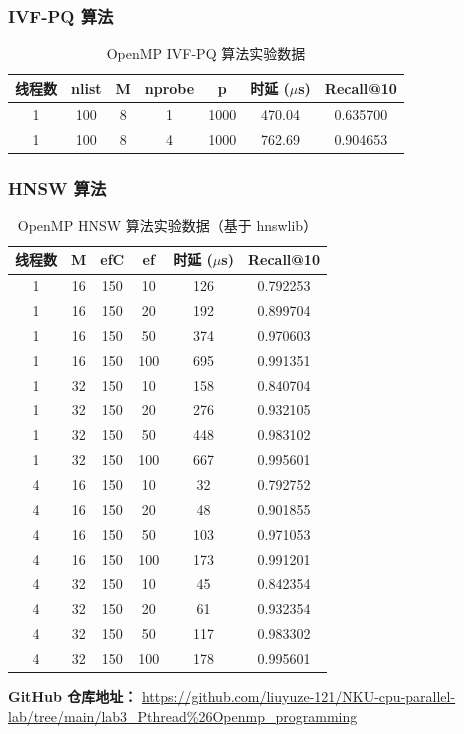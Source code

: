 \documentclass[a4paper]{article}
\begin{document}
\subsubsection{IVF-PQ 算法}

\begin{table}[H]
\centering
\caption{OpenMP IVF-PQ 算法实验数据}
\begin{tabular}{ccccccc}
\toprule
线程数 & nlist & M & nprobe & p & 时延 ($\mu$s) & Recall@10 \\
\midrule
1 & 100 & 8 & 1 & 1000 & 470.04 & 0.635700 \\
1 & 100 & 8 & 4 & 1000 & 762.69 & 0.904653 \\
\bottomrule
\end{tabular}
\end{table}

\subsubsection{HNSW 算法}

\begin{table}[H]
\centering
\caption{OpenMP HNSW 算法实验数据（基于 hnswlib）}
\begin{tabular}{cccccc}
\toprule
线程数 & M & efC & ef & 时延 ($\mu$s) & Recall@10 \\
\midrule
1 & 16 & 150 & 10 & 126 & 0.792253 \\
1 & 16 & 150 & 20 & 192 & 0.899704 \\
1 & 16 & 150 & 50 & 374 & 0.970603 \\
1 & 16 & 150 & 100 & 695 & 0.991351 \\
1 & 32 & 150 & 10 & 158 & 0.840704 \\
1 & 32 & 150 & 20 & 276 & 0.932105 \\
1 & 32 & 150 & 50 & 448 & 0.983102 \\
1 & 32 & 150 & 100 & 667 & 0.995601 \\
4 & 16 & 150 & 10 & 32 & 0.792752 \\
4 & 16 & 150 & 20 & 48 & 0.901855 \\
4 & 16 & 150 & 50 & 103 & 0.971053 \\
4 & 16 & 150 & 100 & 173 & 0.991201 \\
4 & 32 & 150 & 10 & 45 & 0.842354 \\
4 & 32 & 150 & 20 & 61 & 0.932354 \\
4 & 32 & 150 & 50 & 117 & 0.983302 \\
4 & 32 & 150 & 100 & 178 & 0.995601 \\
\bottomrule
\end{tabular}
\end{table}

\noindent\textbf{GitHub 仓库地址：} \url{https://github.com/liuyuze-121/NKU-cpu-parallel-lab/tree/main/lab3_Pthread%26Openmp_programming}
\end{document}
